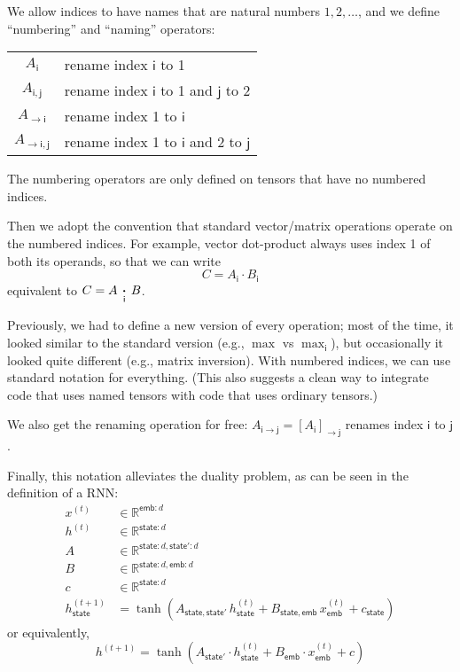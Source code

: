 \documentclass{article}
\newcommand{\name}[1]{\mathsf{#1}}
\newcommand{\ndot}[1]{\mathbin{\mathop{\thinspace\boldsymbol\cdot\thinspace}\limits_{\name{#1}}}}
\begin{document}
We allow indices to have names that are natural numbers $1, 2, \ldots$, and we define ``numbering'' and ``naming'' operators:
\begin{center}
\begin{tabular}{cl}
$A_{\name{i}}$ & rename index $\name{i}$ to 1 \\
$A_{\name{i},\name{j}}$ & rename index $\name{i}$ to 1 and $\name{j}$ to 2 \\
$A_{\rightarrow\name{i}}$ & rename index 1 to $\name{i}$ \\
$A_{\rightarrow\name{i},\name{j}}$ & rename index 1 to $\name{i}$ and 2 to $\name{j}$
\end{tabular}
\end{center}
The numbering operators are only defined on tensors that have no numbered indices.

Then we adopt the convention that standard vector/matrix operations operate on the numbered indices. For example, vector dot-product always uses index 1 of both its operands, so that we can write
\begin{equation*}
C = A_{\name{i}} \cdot B_{\name{i}}
\end{equation*}
equivalent to $C = A \ndot{i} B$. 

Previously, we had to define a new version of every operation; most of the time, it looked similar to the standard version (e.g., $\max$ vs $\max_{\name{i}}$), but occasionally it looked quite different (e.g., matrix inversion). With numbered indices, we can use standard notation for everything.
(This also suggests a clean way to integrate code that uses named tensors with code that uses ordinary tensors.)

We also get the renaming operation for free: $A_{\name{i}\rightarrow\name{j}} = [A_{\name{i}}]_{\rightarrow\name{j}}$ renames index $\name{i}$ to $\name{j}$.

Finally, this notation alleviates the duality problem, as can be seen in the definition of a RNN:
\begin{align*}
x^{(t)} &\in \mathbb{R}^{\name{emb}: d} \\
h^{(t)} &\in \mathbb{R}^{\name{state}: d} \\
A &\in \mathbb{R}^{\name{state}: d, \name{state'}: d} \\
B &\in \mathbb{R}^{\name{state}: d, \name{emb}: d} \\
c &\in \mathbb{R}^{\name{state}: d} \\
h^{(t+1)}_{\name{state}} &= \tanh\left( A_{\name{state},\name{state'}} \, h^{(t)}_{\name{state}} + B_{\name{state},\name{emb}} \, x^{(t)}_{\name{emb}} + c_{\name{state}} \right)
\end{align*}
or equivalently,
\begin{equation*}
h^{(t+1)} = \tanh\left( A_{\name{state'}} \cdot h^{(t)}_{\name{state}} + B_{\name{emb}} \cdot x^{(t)}_{\name{emb}} + c \right)
\end{equation*}
\end{document}
